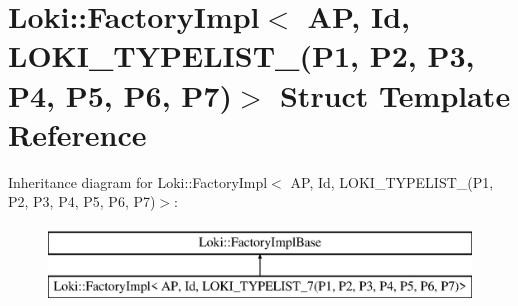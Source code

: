 \hypertarget{structLoki_1_1FactoryImpl_3_01AP_00_01Id_00_01LOKI__TYPELIST__7_07P1_00_01P2_00_01P3_00_01P4_00_01P5_00_01P6_00_01P7_08_4}{}\section{Loki\+:\+:Factory\+Impl$<$ A\+P, Id, L\+O\+K\+I\+\_\+\+T\+Y\+P\+E\+L\+I\+S\+T\+\_(P1, P2, P3, P4, P5, P6, P7)$>$ Struct Template Reference}
\label{structLoki_1_1FactoryImpl_3_01AP_00_01Id_00_01LOKI__TYPELIST__7_07P1_00_01P2_00_01P3_00_01P4_00_01P5_00_01P6_00_01P7_08_4}
Inheritance diagram for Loki\+:\+:Factory\+Impl$<$ A\+P, Id, L\+O\+K\+I\+\_\+\+T\+Y\+P\+E\+L\+I\+S\+T\+\_(P1, P2, P3, P4, P5, P6, P7)$>$\+:\begin{figure}[H]
\begin{center}
\leavevmode
\includegraphics[height=2.000000cm]{structLoki_1_1FactoryImpl_3_01AP_00_01Id_00_01LOKI__TYPELIST__7_07P1_00_01P2_00_01P3_00_01P4_00_01P5_00_01P6_00_01P7_08_4}
\end{center}
\end{figure}
